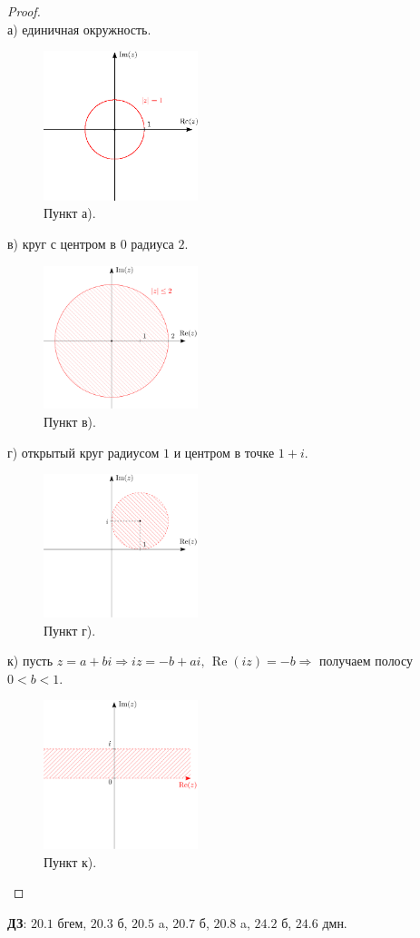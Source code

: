 \documentclass[12pt]{article}
\theoremstyle{definition}
\DeclareMathOperator{\RE}{\operatorname{Re}}
\begin{document}
\begin{proof}\hfill\\
	а) единичная окружность.
	\begin{figure}[H]
		\centering
		\includegraphics[width=0.4\textwidth]{AL1S1_5.eps}
		\caption{Пункт а).}
		\label{1_5}
	\end{figure}
	в) круг с центром в $0$ радиуса $2$.
	\begin{figure}[H]
		\centering
		\includegraphics[width=0.4\textwidth]{AL1S1_6.png}
		\caption{Пункт в).}
		\label{1_6}
	\end{figure}
	\newpage
	г) открытый круг радиусом $1$ и центром в точке $1 + i$.
	\begin{figure}[H]
		\centering
		\includegraphics[width=0.4\textwidth]{AL1S1_7.png}
		\caption{Пункт г).}
		\label{1_7}
	\end{figure}
	к) пусть $z =a + bi \Rightarrow iz  = -b + ai, \, \RE{(iz)} = -b \Rightarrow$ получаем полосу $0 < b < 1$.
	\begin{figure}[H]
		\centering
		\includegraphics[width=0.4\textwidth]{AL1S1_8.png}
		\caption{Пункт к).}
		\label{1_8}
	\end{figure}
\end{proof}

\textbf{ДЗ}: $20.1$ бгем, $20.3$ б, $20.5$ a, $20.7$ б, $20.8$ a, $24.2$ б, $24.6$ дмн.
\end{document}
